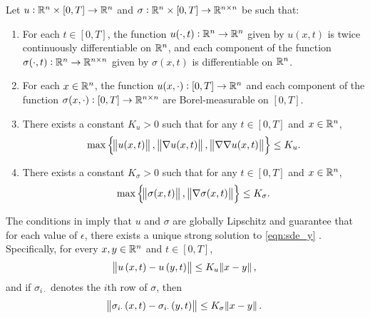 \renewcommand\thehypo{H}
\begin{hypo}\label{hyp:smooth}
	Let \(u: \mathbb{R}^n\times [0,T] \to \mathbb{R}^n\) and \(\sigma: \mathbb{R}^n \times [0,T] \to \mathbb{R}^{n\times n}\) be such that:
	\begin{enumerate}[label=(H.\arabic{*}), ref=H.\arabic{*}]
		\item\label{hyp:coef_cont} For each \(t \in [0,T]\), the function \(u(\cdot, t): \mathbb{R}^n \to \mathbb{R}^n\) given by \(u(x,t)\) is twice continuously differentiable on \(\mathbb{R}^n\), and each component of the function \(\sigma(\cdot, t): \mathbb{R}^n \to \mathbb{R}^{n\times n}\) given by \(\sigma(x,t)\) is differentiable on \(\mathbb{R}^n\).

		\item\label{hyp:coef_meas} For each \(x \in \mathbb{R}^n\), the function \(u(x,\cdot): [0,T] \to \mathbb{R}^n\) and each component of the function \(\sigma(x,\cdot): [0,T] \to \mathbb{R}^{n\times n}\) are Borel-measurable on \([0,T]\).

		\item\label{hyp:u_bounds} There exists a constant \(K_u > 0\) such that for any \(t \in [0,T]\) and \(x \in \mathbb{R}^n\),
		\begin{equation*}
			\max\set{\norm{u(x,t)},\, \norm{\nabla u(x,t)},\, \norm{\nabla \nabla u(x,t)}} \leq K_u.
		\end{equation*}


		\item\label{hyp:sigma_bounds} There exists a constant \(K_\sigma > 0\) such that for any \(t \in [0,T]\) and \(x \in \mathbb{R}^n\),
		\begin{equation*}
			\max\set{\norm{\sigma(x,t)},\, \norm{\nabla{\sigma(x,t)}}} \leq K_{\sigma}.
		\end{equation*}
	\end{enumerate}

\end{hypo}
The conditions in  imply that \(u\) and \(\sigma\) are globally Lipschitz and guarantee that for each value of \(\epsilon\), there exists a unique strong solution to \eqref{eqn:sde_y} \cite{KallianpurSundar_2014_StochasticAnalysisDiffusion}.
Specifically, for every \(x,y \in \mathbb{R}^n\) and \(t \in [0,T]\),
\begin{equation}
	\norm{u\left(x,t\right) - u\left(y,t\right)} \leq K_u\norm{x - y},
	\label{eqn:u_lipschitz}
\end{equation}
and if \(\sigma_{i\cdot}\) denotes the \(i\)th row of \(\sigma\), then
\begin{equation}
	\norm{\sigma_{i\cdot}\left(x,t\right) - \sigma_{i\cdot}\left(y,t\right)} \leq K_\sigma \norm{x - y}.
	\label{eqn:sigma_lipschitz}
\end{equation}

